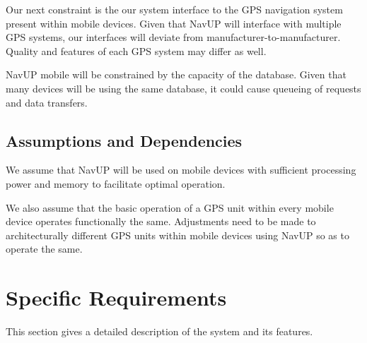 \documentclass{article}
\begin{document}
        \begin{flushleft}
        Our next constraint is the our system interface to the GPS navigation system present within mobile devices. Given that NavUP will interface with multiple GPS systems, our interfaces will deviate from manufacturer-to-manufacturer. Quality and features of each GPS system may differ as well.
        \end{flushleft}
        
        \begin{flushleft}
        NavUP mobile will be constrained by the capacity of the database. Given that many devices will be using the same database, it could cause queueing of requests and data transfers.
        \end{flushleft}
        \subsection{Assumptions and Dependencies}
        
        \begin{flushleft}
        We assume that NavUP will be used on mobile devices with sufficient processing power and memory to facilitate optimal operation.
        \end{flushleft}
        
        \begin{flushleft}
        We also assume that the basic operation of a GPS unit within every mobile device operates functionally the same. Adjustments need to be made to architecturally different GPS units within mobile devices using NavUP so as to operate the same.
        \end{flushleft}
\section{Specific Requirements}
    \begin{flushleft}
    This section gives a detailed description of the system and its features.
    \end{flushleft}
\end{document}
